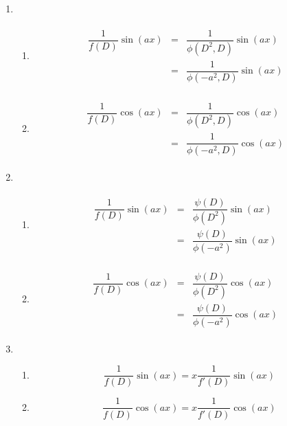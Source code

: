 \documentclass[openany, oneside]{book}
\begin{document}
\begin{enumerate}
\item \begin{enumerate}
\item \begin{equation}\begin{aligned}\begin{split} \dfrac{1}{f(D)} \sin (ax) &=& \dfrac{1}{\phi(D^2,D)} \sin (ax)&\\ &=&\dfrac{1}{\phi(-a^2,D)} \sin (ax) \end{split}\end{aligned}\end{equation}

\item \begin{equation}\begin{aligned}\begin{split} \dfrac{1}{f(D)} \cos (ax) &=& \dfrac{1}{\phi(D^2,D)} \cos (ax)&\\ &=&\dfrac{1}{\phi(-a^2,D)} \cos (ax) \end{split}\end{aligned}\end{equation}
\end{enumerate}

\item \begin{enumerate}
\item \begin{equation}\begin{aligned}\begin{split} \dfrac{1}{f(D)} \sin (ax) &=& \dfrac{\psi(D)}{\phi(D^2)} \sin (ax)&\\ &=&\dfrac{\psi(D)}{\phi(-a^2)} \sin (ax) \end{split}\end{aligned}\end{equation}

\item \begin{equation}\begin{aligned}\begin{split} \dfrac{1}{f(D)} \cos (ax) &=& \dfrac{\psi(D)}{\phi(D^2)} \cos (ax)&\\ &=&\dfrac{\psi(D)}{\phi(-a^2)} \cos (ax) \end{split}\end{aligned}\end{equation}
\end{enumerate}

\item \begin{enumerate}
\item \begin{equation} \dfrac{1}{f(D)} \sin (ax) = x\dfrac{1}{f'(D)} \sin (ax)\end{equation}

\item \begin{equation} \dfrac{1}{f(D)} \cos (ax) = x\dfrac{1}{f'(D)} \cos (ax)\end{equation}
\end{enumerate}
\end{enumerate}
\end{document}
